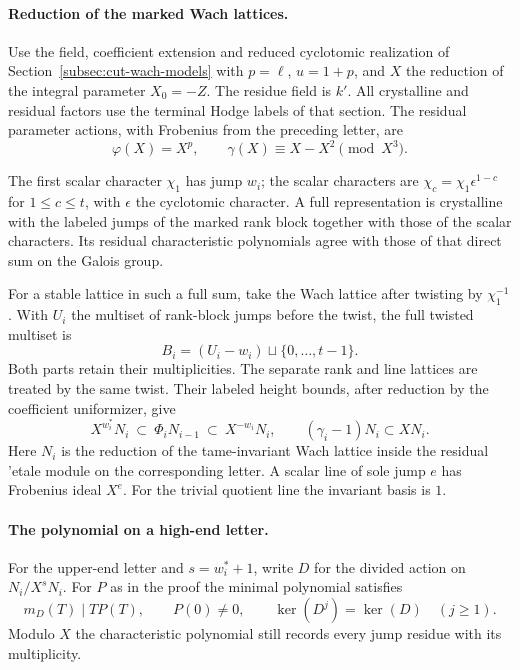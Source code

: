 \paragraph{Reduction of the marked Wach lattices.}
\label{par:residue-wach-realization}
Use the field, coefficient extension and reduced cyclotomic
realization of Section~\ref{subsec:cut-wach-models} with
\(p=\ell\), \(u=1+p\), and \(X\) the reduction of the integral
parameter \(X_0=-Z\). The residue field is \(k'\).
All crystalline and residual factors use the terminal Hodge
labels of that section.
The residual parameter actions, with Frobenius from the preceding letter, are
\[
 \varphi(X)=X^p,\qquad \gamma(X)\equiv X-X^2\pmod{X^3}.
\]


The first scalar character \(\chi_1\) has jump \(w_i\);
the scalar characters are \(\chi_c=\chi_1\epsilon^{1-c}\)
for \(1\le c\le t\), with \(\epsilon\) the cyclotomic character.
A full representation is crystalline with the labeled jumps
of the marked rank block together with those of the scalar
characters. Its residual characteristic polynomials agree with
those of that direct sum on the Galois group.

For a stable lattice
in such a full sum, take the Wach lattice after twisting by
\(\chi_1^{-1}\). With \(U_i\) the multiset of rank-block jumps before the twist, the full twisted multiset is
\[
 B_i=(U_i-w_i)\sqcup\{0,\ldots,t-1\}.
\]
Both parts retain their multiplicities. The separate rank and line lattices
are treated by the same twist. Their labeled height bounds,
after reduction by the coefficient uniformizer, give
\[
      X^{w_i^*}N_i\ \subset\ \Phi_i N_{i-1}
                    \ \subset\ X^{-w_i}N_i,
              \qquad (\gamma_i-1)N_i\subset XN_i .
\]
Here \(N_i\) is the reduction of the tame-invariant Wach lattice
inside the residual 'etale module on the corresponding letter.
A scalar line of sole jump \(e\) has Frobenius ideal \(X^e\).
For the trivial quotient line the invariant basis is \(1\).
\cite{berger-wach}\label{cor:residue-wach-realization-1}

\paragraph{The polynomial on a high-end letter.}
\begin{lemma}
\label{lem:residue-high-end-polynomial}
For the upper-end letter and \(s=w_i^*+1\), write \(D\) for the divided action on \(N_i/X^sN_i\). For \(P\) as in the proof the minimal polynomial satisfies
\[
 m_D(T)\mid TP(T),\qquad P(0)\ne0,\qquad \ker(D^j)=\ker(D)\quad(j\ge1).
\] Modulo \(X\)
the characteristic polynomial still records every jump residue
with its multiplicity.
\end{lemma}

